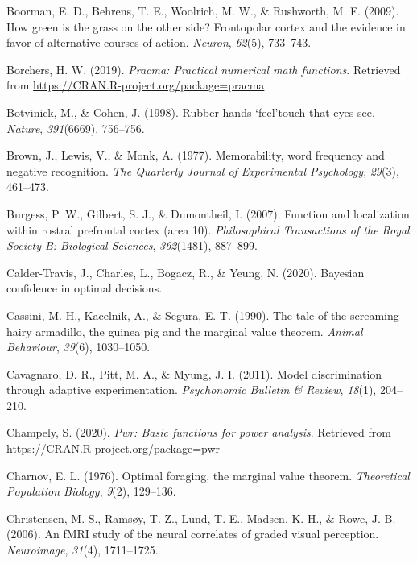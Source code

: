 \documentclass[12pt,twoside]{reedthesis}
\newenvironment{CSLReferences}%
  {}%
  {\par}
\begin{document}
\begin{CSLReferences}{1}{0}
\leavevmode\hypertarget{ref-boorman2009green}{}%
Boorman, E. D., Behrens, T. E., Woolrich, M. W., \& Rushworth, M. F. (2009). How green is the grass on the other side? Frontopolar cortex and the evidence in favor of alternative courses of action. \emph{Neuron}, \emph{62}(5), 733--743.

\leavevmode\hypertarget{ref-R-pracma}{}%
Borchers, H. W. (2019). \emph{Pracma: Practical numerical math functions}. Retrieved from \url{https://CRAN.R-project.org/package=pracma}

\leavevmode\hypertarget{ref-botvinick1998rubber}{}%
Botvinick, M., \& Cohen, J. (1998). Rubber hands `feel'touch that eyes see. \emph{Nature}, \emph{391}(6669), 756--756.

\leavevmode\hypertarget{ref-brown1977memorability}{}%
Brown, J., Lewis, V., \& Monk, A. (1977). Memorability, word frequency and negative recognition. \emph{The Quarterly Journal of Experimental Psychology}, \emph{29}(3), 461--473.

\leavevmode\hypertarget{ref-burgess2007function}{}%
Burgess, P. W., Gilbert, S. J., \& Dumontheil, I. (2007). Function and localization within rostral prefrontal cortex (area 10). \emph{Philosophical Transactions of the Royal Society B: Biological Sciences}, \emph{362}(1481), 887--899.

\leavevmode\hypertarget{ref-calder2020bayesian}{}%
Calder-Travis, J., Charles, L., Bogacz, R., \& Yeung, N. (2020). Bayesian confidence in optimal decisions.

\leavevmode\hypertarget{ref-cassini1990tale}{}%
Cassini, M. H., Kacelnik, A., \& Segura, E. T. (1990). The tale of the screaming hairy armadillo, the guinea pig and the marginal value theorem. \emph{Animal Behaviour}, \emph{39}(6), 1030--1050.

\leavevmode\hypertarget{ref-cavagnaro2011model}{}%
Cavagnaro, D. R., Pitt, M. A., \& Myung, J. I. (2011). Model discrimination through adaptive experimentation. \emph{Psychonomic Bulletin \& Review}, \emph{18}(1), 204--210.

\leavevmode\hypertarget{ref-R-pwr}{}%
Champely, S. (2020). \emph{Pwr: Basic functions for power analysis}. Retrieved from \url{https://CRAN.R-project.org/package=pwr}

\leavevmode\hypertarget{ref-charnov1976optimal}{}%
Charnov, E. L. (1976). Optimal foraging, the marginal value theorem. \emph{Theoretical Population Biology}, \emph{9}(2), 129--136.

\leavevmode\hypertarget{ref-christensen2006fmri}{}%
Christensen, M. S., Ramsøy, T. Z., Lund, T. E., Madsen, K. H., \& Rowe, J. B. (2006). An fMRI study of the neural correlates of graded visual perception. \emph{Neuroimage}, \emph{31}(4), 1711--1725.


\end{CSLReferences}
\end{document}
